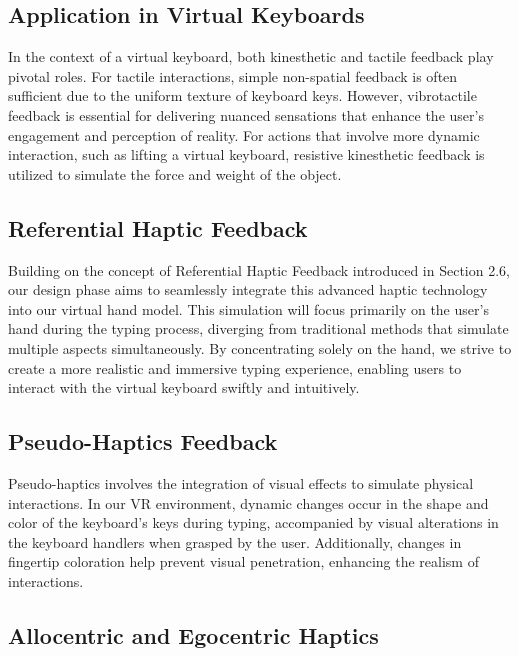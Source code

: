 \subsection{Application in Virtual Keyboards}
\label{subsec:ApplicationInVirtualKeyboards}

In the context of a virtual keyboard, both kinesthetic and tactile feedback play pivotal roles. For tactile interactions, simple non-spatial feedback is often sufficient due to the uniform texture of keyboard keys. However, vibrotactile feedback is essential for delivering nuanced sensations that enhance the user's engagement and perception of reality. For actions that involve more dynamic interaction, such as lifting a virtual keyboard, resistive kinesthetic feedback is utilized to simulate the force and weight of the object.

\subsection{Referential Haptic Feedback}
\label{sec:ReferentialHapticFeedback}

Building on the concept of Referential Haptic Feedback introduced in Section 2.6, our design phase aims to seamlessly integrate this advanced haptic technology into our virtual hand model. This simulation will focus primarily on the user’s hand during the typing process, diverging from traditional methods that simulate multiple aspects simultaneously. By concentrating solely on the hand, we strive to create a more realistic and immersive typing experience, enabling users to interact with the virtual keyboard swiftly and intuitively.

\subsection{Pseudo-Haptics Feedback}
\label{sec:PseudoHapticsFeedback}

Pseudo-haptics involves the integration of visual effects to simulate physical interactions. In our \ac{VR} environment, dynamic changes occur in the shape and color of the keyboard’s keys during typing, accompanied by visual alterations in the keyboard handlers when grasped by the user. Additionally, changes in fingertip coloration help prevent visual penetration, enhancing the realism of interactions.

\subsection{Allocentric and Egocentric Haptics}
\label{sec:AllocentricEgocentricHaptics}

